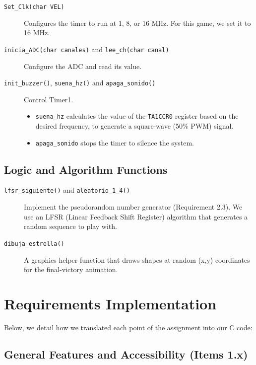 \documentclass[11pt]{article}
\begin{document}
\begin{description}
    \item[\texttt{Set\_Clk(char VEL)}] Configures the timer to run at 1, 8, or 16 MHz. For this game, we set it to 16 MHz.
    \item[\texttt{inicia\_ADC(char canales)} and \texttt{lee\_ch(char canal)}] Configure the ADC and read its value.
    \item[\texttt{init\_buzzer()}, \texttt{suena\_hz()} and \texttt{apaga\_sonido()}] Control Timer1.
    \begin{itemize}
        \item \texttt{suena\_hz} calculates the value of the \texttt{TA1CCR0} register based on the desired frequency, to generate a square-wave (50\% PWM) signal.
        \item \texttt{apaga\_sonido} stops the timer to silence the system.
    \end{itemize}
\end{description}

\subsection{Logic and Algorithm Functions}

\begin{description}
    \item[\texttt{lfsr\_siguiente()} and \texttt{aleatorio\_1\_4()}] Implement the pseudorandom number generator (Requirement 2.3). We use an LFSR (Linear Feedback Shift Register) algorithm that generates a random sequence to play with.
    \item[\texttt{dibuja\_estrella()}] A graphics helper function that draws shapes at random (x,y) coordinates for the final-victory animation.
\end{description}

\section{Requirements Implementation}

Below, we detail how we translated each point of the assignment into our C code:

\subsection{General Features and Accessibility (Items 1.x)}
\end{document}
